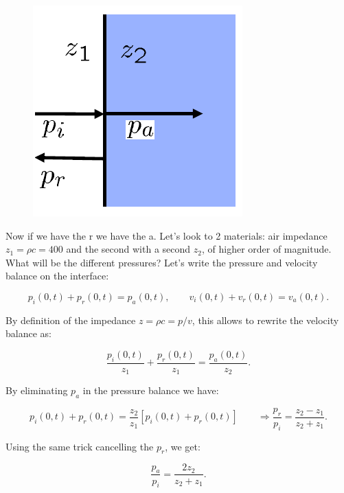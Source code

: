 	\begin{figure}
	\vspace{-5mm}
	\includegraphics[scale=0.3]{acoustics/ch4/3}
	\label{fig:4.3}
	\end{figure}
	Now if we have the r we have the a. Let's look to 2 materials: air impedance $z_1 = \rho c =400$ and the second with a second $z_2$, of higher order of magnitude. What will be the different pressures? Let's write the pressure and velocity balance on the interface:
	
	\begin{equation}
	p_i(0,t)+ p_r(0,t) = p_a(0,t), \qquad v_i(0,t) + v_r(0,t) = v_a(0,t).
	\end{equation}
	
	By definition of the impedance $z = \rho c = p/v$, this allows to rewrite the velocity balance as:
	
	\begin{equation}
	\frac{p_i(0,t)}{z_1} + \frac{p_r(0,t)}{z_1} = \frac{p_a(0,t)}{z_2}.
	\end{equation}
	
	By eliminating $p_a$ in the pressure balance we have: 
	
	\begin{equation}
	p_i(0,t)+ p_r(0,t) = \frac{z_2}{z_1} [p_i(0,t)+ p_r(0,t)] \qquad \Rightarrow \frac{p_r}{p_i} = \frac{z_2 - z_1}{z_2 + z_1}.
	\end{equation}
	
	Using the same trick cancelling the $p_r$, we get:
	
	\begin{equation}
	\frac{p_a}{p_i} = \frac{2z_2}{z_2 + z_1}.
	\end{equation}
	 
